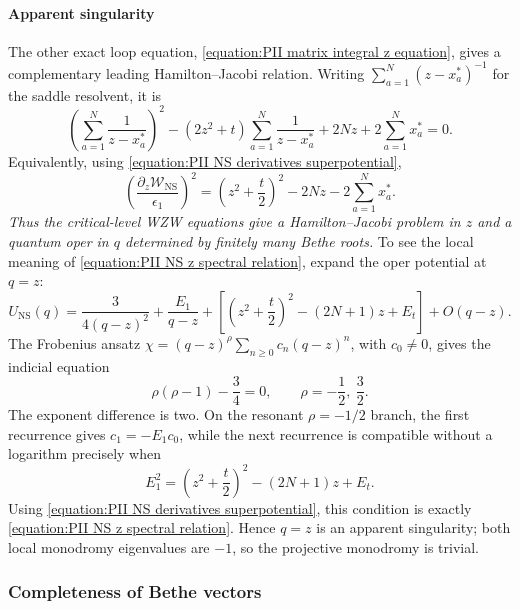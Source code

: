 \documentclass[a4paper,11pt]{article}
\numberwithin{equation}{section}
\begin{document}
\paragraph{Apparent singularity}
The other exact loop equation,
\eqref{equation:PII matrix integral z equation}, gives a complementary
leading Hamilton--Jacobi relation.  Writing
$\sum_{a=1}^{N}(z-x_{a}^{*})^{-1}$ for the saddle resolvent, it is
\begin{equation}
	\label{equation:PII NS z Hamilton Jacobi}
	\left(\sum_{a=1}^{N}\frac{1}{z-x_{a}^{*}}\right)^{2}
	-(2z^{2}+t)\sum_{a=1}^{N}\frac{1}{z-x_{a}^{*}}
	+2Nz+2\sum_{a=1}^{N}x_{a}^{*}=0.
\end{equation}
Equivalently, using \eqref{equation:PII NS derivatives superpotential},
\begin{equation}
	\label{equation:PII NS z spectral relation}
	\left(\frac{\partial_{z}\mathcal{W}_{\mathrm{NS}}}{\epsilon_{1}}\right)^{2}
	=\left(z^{2}+\frac{t}{2}\right)^{2}
	-2Nz-2\sum_{a=1}^{N}x_{a}^{*}.
\end{equation}
{\it Thus the critical-level WZW equations give a Hamilton--Jacobi
problem in $z$ and a quantum oper in $q$ determined by finitely many
Bethe roots.}
To see the local meaning of
\eqref{equation:PII NS z spectral relation}, expand the oper potential
at $q=z$:
\begin{equation}
	U_{\mathrm{NS}}(q)
	=\frac{3}{4(q-z)^{2}}+\frac{E_{1}}{q-z}
	+\left[\left(z^{2}+\frac{t}{2}\right)^{2}
	-(2N+1)z+E_{t}\right]+O(q-z).
\end{equation}
The Frobenius ansatz
$\chi=(q-z)^{\rho}\sum_{n\geq0}c_{n}(q-z)^{n}$, with $c_{0}\ne0$,
gives the indicial equation
\begin{equation}
	\rho(\rho-1)-\frac{3}{4}=0,
	\qquad \rho=-\frac{1}{2},\ \frac{3}{2}.
\end{equation}
The exponent difference is two.  On the resonant
$\rho=-1/2$ branch, the first recurrence gives
$c_{1}=-E_{1}c_{0}$, while the next recurrence is compatible without
a logarithm precisely when
\begin{equation}
	E_{1}^{2}
	=\left(z^{2}+\frac{t}{2}\right)^{2}-(2N+1)z+E_{t}.
\end{equation}
Using \eqref{equation:PII NS derivatives superpotential}, this condition
is exactly \eqref{equation:PII NS z spectral relation}.  Hence $q=z$
is an apparent singularity; both local monodromy eigenvalues are
$-1$, so the projective monodromy is trivial.

\subsubsection{Completeness of Bethe vectors}
\label{subsection:PII NS joint spectrum completeness}
\end{document}
